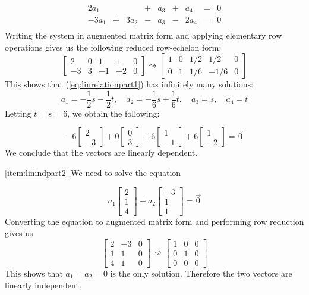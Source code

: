 \documentclass{ximera}
\begin{document}
\begin{example}
\begin{explanation}
$$\begin{array}{ccccccccc}
      2a_1 & &&+&a_3&+&a_4&= &0 \\
        -3a_1& +&3a_2&-&a_3&-&2a_4&= &0 \\
      \end{array}$$
  Writing the system in augmented matrix form and applying elementary row operations gives us the following reduced row-echelon form:
  $$\left[\begin{array}{cccc|c}  
 2&0&1&1&0\\-3&3&-1&-2&0
 \end{array}\right]\rightsquigarrow\left[\begin{array}{cccc|c}  
 1&0&1/2&1/2&0\\0&1&1/6&-1/6&0
 \end{array}\right]$$
 This shows that (\ref{eq:linrelationpart1}) has infinitely many solutions:  
 $$a_1=-\frac{1}{2}s-\frac{1}{2}t,\quad a_2=-\frac{1}{6}s+\frac{1}{6}t,\quad a_3=s,\quad a_4=t$$
 Letting $t=s=6$, we obtain the following:
 
 $$-6\begin{bmatrix}2\\-3\end{bmatrix}+0 \begin{bmatrix}0\\3\end{bmatrix}+6\begin{bmatrix}1\\-1\end{bmatrix}+6\begin{bmatrix}1\\-2\end{bmatrix}=\vec{0}$$
 We conclude that the vectors are linearly dependent.
 
 \ref{item:linindpart2} We need to solve the equation
 
 $$a_1\begin{bmatrix}2\\1\\4\end{bmatrix}+a_2\begin{bmatrix}-3\\1\\1\end{bmatrix}=\vec{0}$$
 Converting the equation to augmented matrix form and performing row reduction gives us
 $$\left[\begin{array}{cc|c}  
 2&-3&0\\1&1&0\\4&1&0
 \end{array}\right]\rightsquigarrow\left[\begin{array}{cc|c}  
 1&0&0\\0&1&0\\0&0&0
 \end{array}\right]$$
 This shows that $a_1=a_2=0$ is the only solution.  Therefore the two vectors are linearly independent.
\end{explanation}
\end{example}
\end{document}
